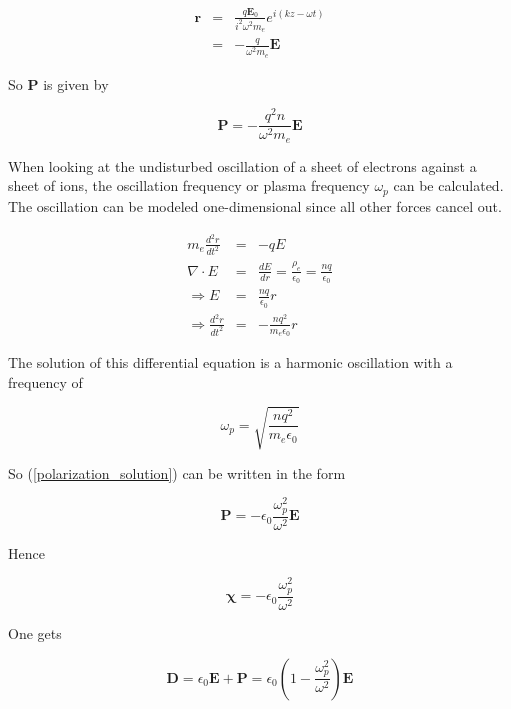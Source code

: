 \documentclass[a4paper,11pt]{thesis}
\begin{document}
\begin{eqnarray}
    \mathbf{r}&=&\frac{q \mathbf{E}_0}{i^2 \omega^2 m_e} e^{i(kz-\omega t)}\\
    &=&-\frac{q }{ \omega^2 m_e} \mathbf{E}
\end{eqnarray}


So \textbf{P} is given by

\begin{equation}\label{polarization_solution}
    \mathbf{P}=-\frac{q^2 n }{ \omega^2 m_e} \mathbf{E}
\end{equation}

When looking at the undisturbed oscillation of a sheet of electrons against a sheet of ions, the oscillation frequency or plasma frequency $\omega_p$ can be calculated. The oscillation can be modeled one-dimensional since all other forces cancel out.

\begin{eqnarray}
  m_e\frac{d^2r}{dt^2} &=& -qE\\
  \nabla \cdot E &=& \frac{dE}{dr}=\frac{\rho_e}{\epsilon_0}=\frac{nq}{\epsilon_0}\\
  \Rightarrow E&=&\frac{nq}{\epsilon_0}r\\
  \Rightarrow \frac{d^2r}{dt^2} &=&-\frac{nq^2}{m_e\epsilon_0}r
\end{eqnarray}

The solution of this differential equation is a harmonic oscillation with a frequency of

\begin{equation}\label{plasmafrequency}
    \omega_p=\sqrt{\frac{nq^2}{m_e\epsilon_0}}
\end{equation}

So (\ref{polarization_solution}) can be written in the form

\begin{equation}\label{polarization_solution_2}
    \mathbf{P}=- \epsilon_0\frac{\omega_p^2 }{ \omega^2 } \mathbf{E}
\end{equation}

Hence

\begin{equation}\label{suszebility_cold_isotropic_plasma}
    \mathbf{\chi}=- \epsilon_0\frac{\omega_p^2 }{ \omega^2 }
\end{equation}

One gets

\begin{equation}\label{D_plasma}
    \mathbf{D}=\epsilon_0 \mathbf{E}+\mathbf{P}=\epsilon_0 \left(1-\frac{\omega_p^2 }{ \omega^2 }\right)\mathbf{E}
\end{equation}
\end{document}
